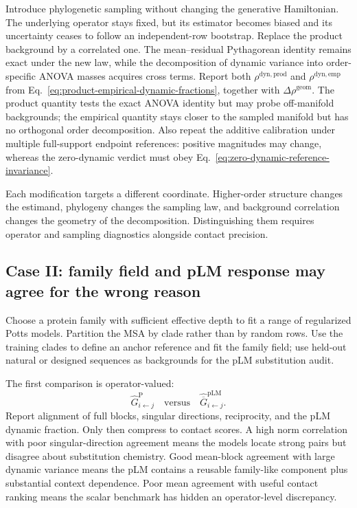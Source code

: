 Introduce phylogenetic sampling without changing the generative Hamiltonian.
The underlying operator stays fixed, but its estimator becomes biased and its uncertainty ceases to
follow an independent-row bootstrap.  Replace the product background by a correlated one.  The
mean--residual Pythagorean identity remains exact under the new law, while the decomposition of
dynamic variance into order-specific ANOVA masses acquires cross terms.  Report both
$\rho^{\mathrm{dyn,prod}}$ and $\rho^{\mathrm{dyn,emp}}$ from
Eq.~\ref{eq:product-empirical-dynamic-fractions}, together with
$\Delta\rho^{\mathrm{geom}}$.  The product quantity tests the exact ANOVA identity but may probe
off-manifold backgrounds; the empirical quantity stays closer to the sampled manifold but has no
orthogonal order decomposition.  Also repeat the additive calibration under multiple full-support
endpoint references: positive magnitudes may change, whereas the zero-dynamic verdict must obey
Eq.~\ref{eq:zero-dynamic-reference-invariance}.

Each modification targets a different coordinate.  Higher-order structure changes the estimand,
phylogeny changes the sampling law, and background correlation changes the geometry of the
decomposition.  Distinguishing them requires operator and sampling diagnostics alongside contact
precision.

\subsection*{Case II: family field and pLM response may agree for the wrong reason}

Choose a protein family with sufficient effective depth to fit a range of regularized Potts models.
Partition the MSA by clade rather than by random rows.  Use the training clades to define an anchor
reference and fit the family field; use held-out natural or designed sequences as backgrounds for
the pLM substitution audit.

The first comparison is operator-valued:
\begin{equation}
\widehat G_{i\leftarrow j}^{\mathrm P}
\quad\text{versus}\quad
\widehat{\overline G}_{i\leftarrow j}^{\mathrm{pLM}}.
\end{equation}
Report alignment of full blocks, singular directions, reciprocity, and the pLM dynamic fraction.
Only then compress to contact scores.  A high norm correlation with poor singular-direction
agreement means the models locate strong pairs but disagree about substitution chemistry.  Good
mean-block agreement with large dynamic variance means the pLM contains a reusable family-like
component plus substantial context dependence.  Poor mean agreement with useful contact ranking
means the scalar benchmark has hidden an operator-level discrepancy.

